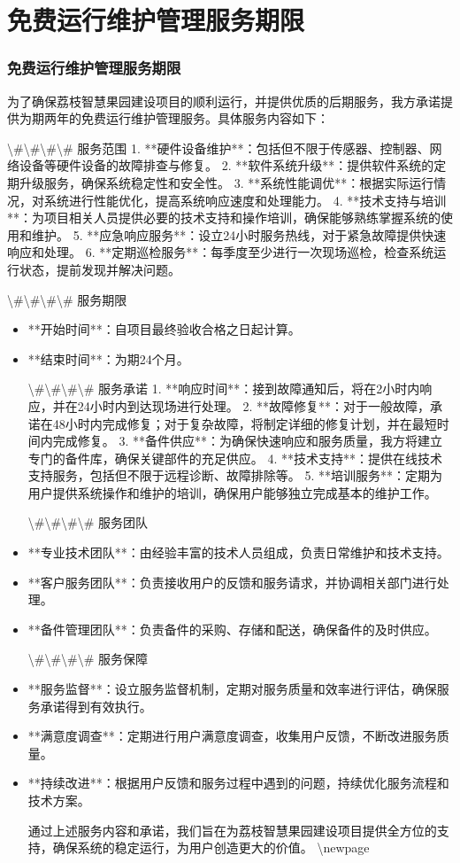 \documentclass[UTF8,a4paper,zihao=-4]{ctexart}
\begin{document}
\section{免费运行维护管理服务期限}

\subsubsection{免费运行维护管理服务期限}

为了确保荔枝智慧果园建设项目的顺利运行，并提供优质的后期服务，我方承诺提供为期两年的免费运行维护管理服务。具体服务内容如下：

\textbackslash{}#\textbackslash{}#\textbackslash{}#\textbackslash{}# 服务范围
1. **硬件设备维护**：包括但不限于传感器、控制器、网络设备等硬件设备的故障排查与修复。
2. **软件系统升级**：提供软件系统的定期升级服务，确保系统稳定性和安全性。
3. **系统性能调优**：根据实际运行情况，对系统进行性能优化，提高系统响应速度和处理能力。
4. **技术支持与培训**：为项目相关人员提供必要的技术支持和操作培训，确保能够熟练掌握系统的使用和维护。
5. **应急响应服务**：设立24小时服务热线，对于紧急故障提供快速响应和处理。
6. **定期巡检服务**：每季度至少进行一次现场巡检，检查系统运行状态，提前发现并解决问题。

\textbackslash{}#\textbackslash{}#\textbackslash{}#\textbackslash{}# 服务期限
\begin{itemize}
\item **开始时间**：自项目最终验收合格之日起计算。
\item **结束时间**：为期24个月。

\textbackslash{}#\textbackslash{}#\textbackslash{}#\textbackslash{}# 服务承诺
1. **响应时间**：接到故障通知后，将在2小时内响应，并在24小时内到达现场进行处理。
2. **故障修复**：对于一般故障，承诺在48小时内完成修复；对于复杂故障，将制定详细的修复计划，并在最短时间内完成修复。
3. **备件供应**：为确保快速响应和服务质量，我方将建立专门的备件库，确保关键部件的充足供应。
4. **技术支持**：提供在线技术支持服务，包括但不限于远程诊断、故障排除等。
5. **培训服务**：定期为用户提供系统操作和维护的培训，确保用户能够独立完成基本的维护工作。

\textbackslash{}#\textbackslash{}#\textbackslash{}#\textbackslash{}# 服务团队
\item **专业技术团队**：由经验丰富的技术人员组成，负责日常维护和技术支持。
\item **客户服务团队**：负责接收用户的反馈和服务请求，并协调相关部门进行处理。
\item **备件管理团队**：负责备件的采购、存储和配送，确保备件的及时供应。

\textbackslash{}#\textbackslash{}#\textbackslash{}#\textbackslash{}# 服务保障
\item **服务监督**：设立服务监督机制，定期对服务质量和效率进行评估，确保服务承诺得到有效执行。
\item **满意度调查**：定期进行用户满意度调查，收集用户反馈，不断改进服务质量。
\item **持续改进**：根据用户反馈和服务过程中遇到的问题，持续优化服务流程和技术方案。

通过上述服务内容和承诺，我们旨在为荔枝智慧果园建设项目提供全方位的支持，确保系统的稳定运行，为用户创造更大的价值。
\textbackslash{}newpage

\end{itemize}
\end{document}
